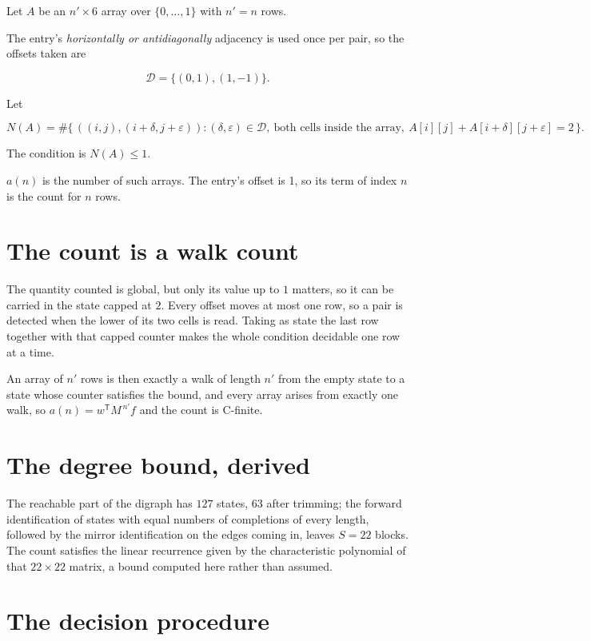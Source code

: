 \documentclass[11pt]{article}
\theoremstyle{definition}
\begin{document}
Let $A$ be an $n' \times 6$ array over $\{0,\dots,1\}$ with $n' = n$ rows.

The entry's {\itshape horizontally or antidiagonally} adjacency is used once per pair, so the offsets taken are

\[\mathcal{D} = \{(0,1), (1,-1)\}.\]

Let

\[N(A) = \#\bigl\{\,((i,j),(i{+}\delta,j{+}\varepsilon)) : (\delta,\varepsilon) \in \mathcal{D},\ \text{both cells inside the array},\ A[i][j] + A[i{+}\delta][j{+}\varepsilon] = 2\,\bigr\}.\]

The condition is $N(A) \le 1$.

$a(n)$ is the number of such arrays. The entry's offset is 1, so its term of index $n$ is the count for $n$ rows.

\section{The count is a walk count}

The quantity counted is global, but only its value up to $1$ matters, so it can be carried in the state capped at $2$. Every offset moves at most one row, so a pair is detected when the lower of its two cells is read. Taking as state the last row together with that capped counter makes the whole condition decidable one row at a time.

An array of $n'$ rows is then exactly a walk of length $n'$ from the empty state to a state whose counter satisfies the bound, and every array arises from exactly one walk, so $a(n) = w^{\mathsf T}M^{\,n'}f$ and the count is C-finite.

\section{The degree bound, derived}

The reachable part of the digraph has $127$ states, $63$ after trimming; the forward identification of states with equal numbers of completions of every length, followed by the mirror identification on the edges coming in, leaves $S = 22$ blocks. The count satisfies the linear recurrence given by the characteristic polynomial of that $22\times22$ matrix, a bound computed here rather than assumed.

\section{The decision procedure}
\end{document}
